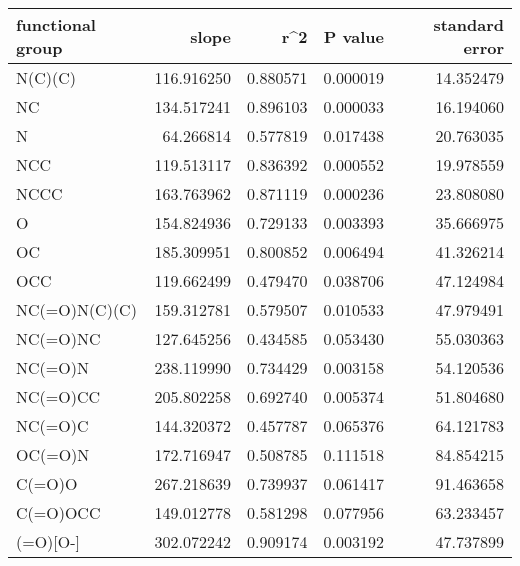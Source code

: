 \begin{tabular}{lrrrr}
\toprule
functional group &      slope &      r\textasciicircum 2 &  P value &  standard error \\
\midrule
         N(C)(C) & 116.916250 & 0.880571 & 0.000019 &       14.352479 \\
              NC & 134.517241 & 0.896103 & 0.000033 &       16.194060 \\
               N &  64.266814 & 0.577819 & 0.017438 &       20.763035 \\
             NCC & 119.513117 & 0.836392 & 0.000552 &       19.978559 \\
            NCCC & 163.763962 & 0.871119 & 0.000236 &       23.808080 \\
               O & 154.824936 & 0.729133 & 0.003393 &       35.666975 \\
              OC & 185.309951 & 0.800852 & 0.006494 &       41.326214 \\
             OCC & 119.662499 & 0.479470 & 0.038706 &       47.124984 \\
   NC(=O)N(C)(C) & 159.312781 & 0.579507 & 0.010533 &       47.979491 \\
        NC(=O)NC & 127.645256 & 0.434585 & 0.053430 &       55.030363 \\
         NC(=O)N & 238.119990 & 0.734429 & 0.003158 &       54.120536 \\
        NC(=O)CC & 205.802258 & 0.692740 & 0.005374 &       51.804680 \\
         NC(=O)C & 144.320372 & 0.457787 & 0.065376 &       64.121783 \\
         OC(=O)N & 172.716947 & 0.508785 & 0.111518 &       84.854215 \\
          C(=O)O & 267.218639 & 0.739937 & 0.061417 &       91.463658 \\
        C(=O)OCC & 149.012778 & 0.581298 & 0.077956 &       63.233457 \\
    [N+](=O)[O-] & 302.072242 & 0.909174 & 0.003192 &       47.737899 \\
\bottomrule
\end{tabular}
